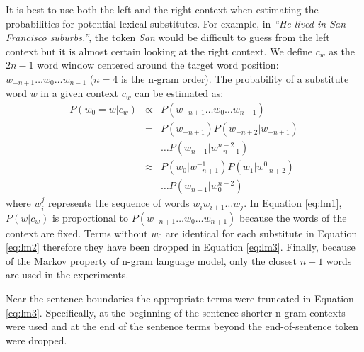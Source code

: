 It is best to use both the left and the right context when estimating the
probabilities for potential lexical substitutes.  For example, in
\emph{``He lived in San Francisco suburbs.''}, the token \emph{San}
would be difficult to guess from the left context but it is almost
certain looking at the right context.  We define $c_w$ as the $2n-1$
word window centered around the target word position: $w_{-n+1} \ldots
w_0 \ldots w_{n-1}$ ($n=4$ is the n-gram order).  The probability of a
substitute word $w$ in a given context $c_w$ can be estimated as:
\begin{eqnarray}
  \label{eq:lm1}P(w_0 = w | c_w) & \propto & P(w_{-n+1}\ldots w_0\ldots w_{n-1})\\
  \label{eq:lm2}& = & P(w_{-n+1})P(w_{-n+2}|w_{-n+1})\nonumber\\
  &&\ldots P(w_{n-1}|w_{-n+1}^{n-2})\\
  \label{eq:lm3}& \approx & P(w_0| w_{-n+1}^{-1})P(w_{1}|w_{-n+2}^0)\nonumber\\
  &&\ldots P(w_{n-1}|w_0^{n-2})
\end{eqnarray}
where $w_i^j$ represents the sequence of words $w_i w_{i+1} \ldots
w_{j}$.  In Equation \ref{eq:lm1}, $P(w|c_w)$ is proportional to
$P(w_{-n+1}\ldots w_0 \ldots w_{n+1})$ because the words of the
context are fixed.  Terms without $w_0$ are identical for each
substitute in Equation \ref{eq:lm2} therefore they have been dropped
in Equation \ref{eq:lm3}.  Finally, because of the Markov property of
n-gram language model, only the closest $n-1$ words are used in the
experiments.

Near the sentence boundaries the appropriate terms were truncated in
Equation \ref{eq:lm3}.  Specifically, at the beginning of the sentence
shorter n-gram contexts were used and at the end of the sentence terms
beyond the end-of-sentence token were dropped.  


